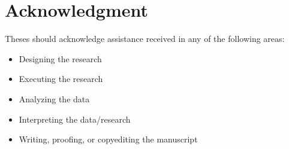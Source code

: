 \chapter*{Acknowledgment} 

Theses should acknowledge assistance received in any of the following areas:

\begin{itemize}
\item Designing the research
\item Executing the research
\item Analyzing the data
\item Interpreting the data/research
\item Writing, proofing, or copyediting the manuscript 
\end{itemize}
